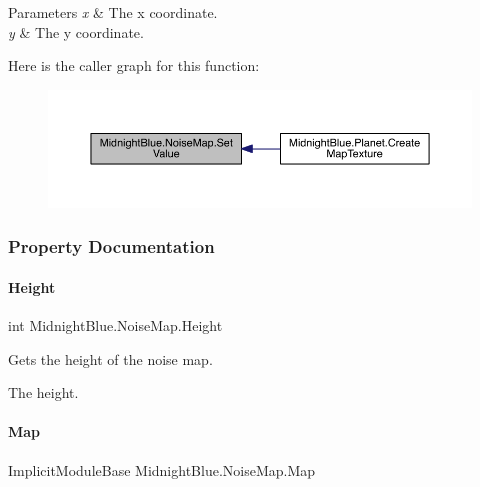 \begin{DoxyParams}{Parameters}
{\em x} & The x coordinate.\\
\hline
{\em y} & The y coordinate.\\
\hline
\end{DoxyParams}
Here is the caller graph for this function\+:\nopagebreak
\begin{figure}[H]
\begin{center}
\leavevmode
\includegraphics[width=350pt]{class_midnight_blue_1_1_noise_map_a26d94cbea4c0377833bed064cbd36496_icgraph}
\end{center}
\end{figure}


\subsubsection{Property Documentation}
\hypertarget{class_midnight_blue_1_1_noise_map_abfffdfa7bb7a696e495bbfb2e6ac0c57}{}\label{class_midnight_blue_1_1_noise_map_abfffdfa7bb7a696e495bbfb2e6ac0c57} 
\paragraph{\texorpdfstring{Height}{Height}}
{\footnotesize\ttfamily int Midnight\+Blue.\+Noise\+Map.\+Height\hspace{0.3cm}{\ttfamily [get]}}



Gets the height of the noise map. 

The height.\hypertarget{class_midnight_blue_1_1_noise_map_a428d013274d19ed0775adc6d32f00719}{}\label{class_midnight_blue_1_1_noise_map_a428d013274d19ed0775adc6d32f00719} 
\paragraph{\texorpdfstring{Map}{Map}}
{\footnotesize\ttfamily Implicit\+Module\+Base Midnight\+Blue.\+Noise\+Map.\+Map\hspace{0.3cm}{\ttfamily [get]}}



